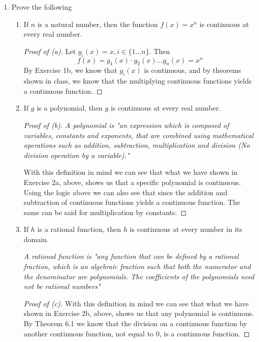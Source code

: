 \documentclass{article} %
\theoremstyle{plain}
\theoremstyle{definition}
\theoremstyle{case}
\begin{document}
\begin{enumerate}[label={\fbox{\textbf{Exercise \#\arabic* :}}}]
\begin{enumerate}
\begin{proof}[Proof of (b)]
        \end{proof}
    \end{enumerate}



\newpage

\item Prove the following
  \begin{enumerate}
    \item If $n$ is a natural number, then the function $f(x) = x^n$ is
      continuous at every real number.

        \begin{proof}[Proof of (a)]
          Let $g_i(x) = x, i \in \{1\dots n\}$.  Then
            \[ f(x) = g_1(x) \cdot g_2(x) \dots g_n(x) = x^n \]
            By Exercise 1b, we know that $g_i(x)$ is continuous, and 
            by theorems shown in class, we 
            know that the multiplying continuous functions yields a 
            continuous function.
        \end{proof}

    \item If $g$ is a polynomial, then $g$ is continuous at every real number.
        \begin{proof}[Proof of (b)]
          \emph{A polynomial is "an expression which is composed of variables,
          constants and exponents, that are combined using mathematical
          operations such as addition, subtraction, multiplication and
        division (No division operation by a variable)."}

          With this definition in mind we can see that what we have
          shown in Exercise 2a, above, shows us that a specific polynomial
          is continuous.  Using the logic above we can also see that 
          since the addition and subtraction of continuous functions yields
          a continuous function.  The same can be said for multiplication
          by constants.
        \end{proof}

    \item If $h$ is a rational function, then $h$ is continuous at every number in its domain.

        \emph{A rational function is "any function that can be defined by a rational fraction, which is an algebraic fraction such that both the numerator and the denominator are polynomials. The coefficients of the polynomials need not be rational numbers"} 

        \begin{proof}[Proof of (c)]
          With this definition in mind we can see that what we have
          shown in Exercise 2b, above, shows us that any polynomial is
          continuous.  By Theorem 6.1 we know that the division on a
          continuous function by another continuous function, not equal
          to 0, is a continuous function.
        \end{proof}
  \end{enumerate}




\end{enumerate}
\end{document}
